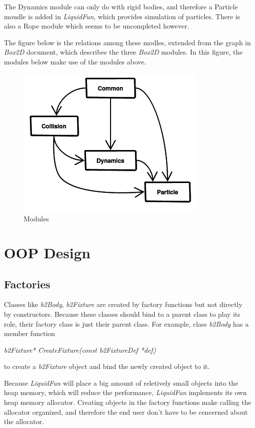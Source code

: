 \documentclass[UTF8]{ctexart}
\begin{document}
        The Dynamics module can only do with rigid bodies, and therefore a Particle moudle is added in \textit{LiquidFun}, which provides simulation of particles. There is also a Rope module which seems to be uncompleted however.

        The figure below is the relations among these modles, extended from the graph in \textit{Box2D} document, which describes the three \textit{Box2D} modules. In this figure, the modules below make use of the modules above.

        \begin{figure}[ht]
            \centering
            \includegraphics[width=.5\textwidth]{modules.png}
            \caption{Modules}
        \end{figure}

    \section{OOP Design}

        \subsection{Factories}

            Classes like \textit{b2Body}, \textit{b2Fixture} are created by factory functions but not directly by constructors. Because these classes should bind to a parent class to play its role, their factory class is just their parent class. For example, class \textit{b2Body} has a member function
            
            \textit{b2Fixture* CreateFixture(const b2FixtureDef *def)}

            \noindent to create a \textit{b2Fixture} object and bind the newly created object to it.

            Because \textit{LiquidFun} will place a big amount of reletively small objects into the heap memory, which will reduce the performance, \textit{LiquidFun} implements its own heap memory allocator. Creating objects in the factory functions make calling the allocator organized, and therefore the end user don't have to be cencerned about the allocator.
\end{document}

